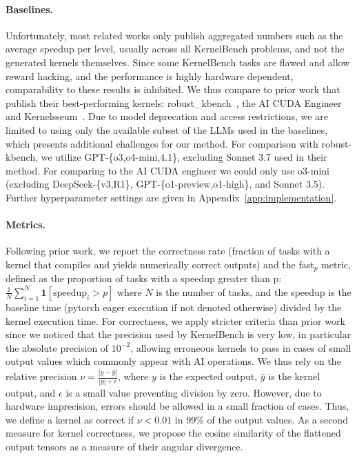 \paragraph{Baselines.}
Unfortunately, most related works only publish aggregated numbers such as the average speedup per level, usually across all KernelBench problems, and not the generated kernels themselves. Since some KernelBench tasks are flawed and allow reward hacking, and the performance is highly hardware dependent, comparability to these results is inhibited. We thus compare to prior work that publish their best-performing kernels: robust\_kbench~\cite{lange2025towards}, the AI CUDA Engineer~\cite{lange2025ai} and Kernelsseum~\cite{kernelsseum, ouyang2025kernelbench}. 
Due to model deprecation and access restrictions, we are limited to using only the available subset of the LLMs used in the baselines, which presents additional challenges for our method. %
For comparison with robust-kbench, we utilize GPT-\{o3,o4-mini,4.1\}, excluding Sonnet 3.7 used in their method. For comparing to the AI CUDA engineer we could only use o3-mini (excluding DeepSeek-\{v3,R1\}, GPT-\{o1-preview,o1-high\}, and Sonnet 3.5). 
Further hyperparameter settings are given in Appendix~\ref{app:implementation}.


\paragraph{Metrics.}
Following prior work, we report the correctness rate (fraction of tasks with a kernel that compiles and yields numerically correct outputs) and the fast$_p$ metric, defined as the proportion of tasks with a speedup greater than p: $\frac{1}{N} \sum_{i=1}^N \mathbf{1}[\text{speedup}_i > p]$ where $N$ is the number of tasks, and the speedup is the baseline time (pytorch eager execution if not denoted otherwise) divided by the kernel execution time. 
For correctness, we apply stricter criteria than prior work since we noticed that the precision used by KernelBench is very low, in particular the absolute precision of $10^{-2}$, allowing erroneous kernels to pass in cases of small output values which commonly appear with AI operations. We thus rely on the relative precision $\nu = \frac{| y - \hat{y}|}{|y| + \epsilon}$, where $y$ is the expected output, $\hat{y}$ is the kernel output, and $\epsilon$ is a small value preventing division by zero. However, due to hardware imprecision, errors should be allowed in a small fraction of cases. Thus, we define a kernel as correct if $\nu < 0.01$ in 99\% of the output values. As a second measure for kernel correctness, we propose the cosine similarity of the flattened output tensors as a measure of their angular divergence.


